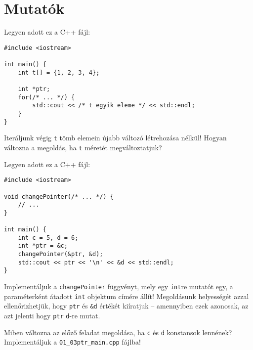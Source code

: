 \documentclass[../exercise_book/exercise_book.tex]{subfiles}
\begin{document}
	\section{Mutatók}
	
	\begin{exercise}
		Legyen adott ez a C++ fájl:
		
		\smallskip
		\begin{lstlisting}
#include <iostream>

int main() {
	int t[] = {1, 2, 3, 4};
	
	int *ptr;
	for(/* ... */) {
		std::cout << /* t egyik eleme */ << std::endl;
	}
}
		\end{lstlisting}
		Iteráljunk végig \texttt{t} tömb elemein újabb változó létrehozása nélkül! Hogyan változna a megoldás, ha \texttt{t} méretét megváltoztatjuk?
	\end{exercise}
	\begin{exercise}
		Legyen adott ez a C++ fájl:
		
		\smallskip
		\fbox{\textbf{01\_02ptr\_main.cpp}}
		\begin{lstlisting}
#include <iostream>

void changePointer(/* ... */) {
	// ...
}

int main() {
	int c = 5, d = 6;
	int *ptr = &c;
	changePointer(&ptr, &d);
	std::cout << ptr << '\n' << &d << std::endl;
}
		\end{lstlisting}
		Implementáljuk a \texttt{changePointer} függvényt, mely egy \texttt{int}re mutatót egy, a paraméterként átadott \texttt{int} objektum címére állít! Megoldásunk helyességét azzal ellenőrizhetjük, hogy \texttt{ptr} és \texttt{\&d} értékét kiíratjuk -- amennyiben ezek azonosak, az azt jelenti hogy \texttt{ptr} \texttt{d}-re mutat.
	\end{exercise}
	\begin{exercise}
		Miben változna az előző feladat megoldása, ha \texttt{c} és \texttt{d} konstansok lennének? Implementáljuk a \texttt{01\_03ptr\_main.cpp} fájlba!
	\end{exercise}
\end{document}
